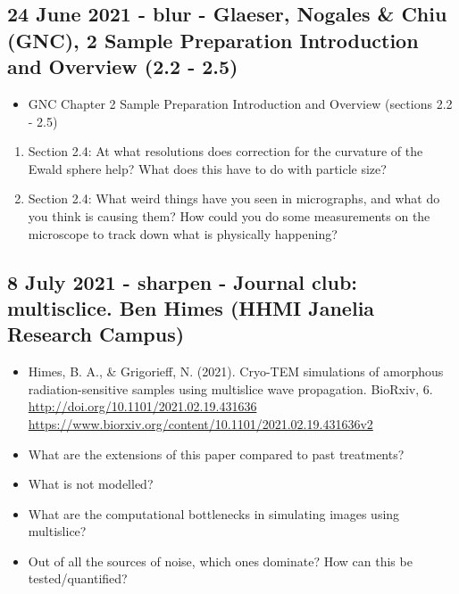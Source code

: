 \documentclass[11pt, oneside]{article}   	%
\begin{document}



\pagebreak

\subsection{24 June 2021 - blur - Glaeser, Nogales \& Chiu (GNC), 2 Sample Preparation Introduction and Overview (2.2 - 2.5)}
\begin{itemize}
	\item GNC Chapter 2 Sample Preparation Introduction and Overview (sections 2.2 - 2.5)
\end{itemize}
\begin{enumerate}
	\item Section 2.4: At what resolutions does correction for the curvature of the Ewald sphere help? What does this have to do with particle size?
	\item Section 2.4: What weird things have you seen in micrographs, and what do you think is causing them? How could you do some measurements on the microscope to track down what is physically happening?
\end{enumerate}

\subsection{8 July 2021 - sharpen - Journal club: multisclice. Ben Himes (HHMI Janelia Research Campus)}
\begin{itemize}
	\item Himes, B. A., \& Grigorieff, N. (2021). Cryo-TEM simulations of amorphous radiation-sensitive samples using multislice wave propagation. BioRxiv, 6. \url{http://doi.org/10.1101/2021.02.19.431636} \url{https://www.biorxiv.org/content/10.1101/2021.02.19.431636v2}
\end{itemize}
\begin{itemize}
	\item What are the extensions of this paper compared to past treatments?
	\item What is not modelled?
	\item What are the computational bottlenecks in simulating images using multislice?
	\item Out of all the sources of noise, which ones dominate? How can this be tested/quantified?
\end{itemize}
\end{document}
